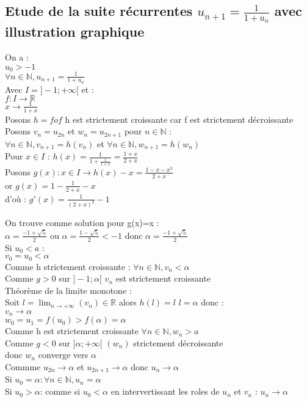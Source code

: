 \documentclass{article}
\begin{document}
\subsection{Etude de la suite récurrentes $u_{n+1}= \frac{1}{1+u_n}$ avec illustration graphique}
On a : \\ 
$u_0>-1$ \\ 
$\forall n \in \mathbb{N},u_{n+1}=\frac{1}{1+u_n}$ \\ 
Avec $I=]-1; +\infty[$ et : \\
$f: I \rightarrow \mathbb{R}$ \\ 
$x \rightarrow \frac{1}{1+x}$ \\ 
Posons $h= f of$ h est strictement croissante car f est strictement décroissante \\ 
Posons $v_n=u_{2n}$ et $w_n=u_{2n+1}$ pour $n \in \mathbb{N}$ : \\ 
$\forall n \in \mathbb{N},v_{n+1}=h(v_n)$ et $\forall n \in \mathbb{N},w_{n+1}=h(w_n)$ \\ 
Pour $x \in  I$ : $h(x)=\frac{1}{1+\frac{1}{1+x}}=\frac{1+x}{2+x}$ \\ 
Posons $g(x): x \in I \rightarrow h(x)-x=\frac{1-x-x^2}{2+x}$ \\ 
or $g(x)=1-\frac{1}{2+x}-x$ \\ 
d'où : $g'(x)=\frac{1}{(2+x)^2}-1$ \\ 
On trouve comme solution pour g(x)=x : \\ 
$\alpha=\frac{-1+\sqrt{5}}{2}$ ou $\alpha=\frac{1-\sqrt{5}}{2}<-1$ donc $\alpha=\frac{-1+\sqrt{5}}{2}$ \\ 
Si $u_0<a$ : \\ 
$v_0=u_0< \alpha$ \\ 
Comme h strictement croissante : $\forall n \in \mathbb{N},v_n<\alpha$ \\
Comme $g>0$ sur $]-1;\alpha[$ $v_n$ est strictement croissante \\ 
Théorème de la limite monotone : \\ 
Soit $l=\lim_{n \rightarrow + \infty}(v_n)\in \mathbb{R}$ alors $h(l)=l$ $l=\alpha$ donc : \\ 
$v_n \rightarrow \alpha$ \\ 
$w_0=u_1=f(u_0)>f(\alpha)=\alpha$ \\ 
Comme h est strictement croissante $\forall n \in \mathbb{N}, w_n>a$ \\ 
Comme $g<0$ sur $]\alpha;+\infty[$ $(w_n)$ strictement décroissante \\ 
donc $w_n$ converge vers $\alpha$ \\ 
Commme $u_{2n}\rightarrow \alpha$ et $u_{2n+1} \rightarrow \alpha$ donc $u_n \rightarrow \alpha$  \\ 
Si $u_0=\alpha : \forall n\in \mathbb{N}, u_n=\alpha$ \\ 
Si $u_0>\alpha$: comme si $u_0<\alpha$ en intervertissant les roles de $u_n$ et $v_n$ : $u_n \rightarrow \alpha$
\end{document}
